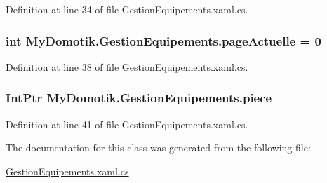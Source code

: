 Definition at line 34 of file Gestion\+Equipements.\+xaml.\+cs.

\subsubsection[{\texorpdfstring{page\+Actuelle}{pageActuelle}}]{\setlength{\rightskip}{0pt plus 5cm}int My\+Domotik.\+Gestion\+Equipements.\+page\+Actuelle = 0\hspace{0.3cm}{\ttfamily [private]}}\hypertarget{class_my_domotik_1_1_gestion_equipements_a87d2835bb2e08eeb5a1e0c047f11b958}{}\label{class_my_domotik_1_1_gestion_equipements_a87d2835bb2e08eeb5a1e0c047f11b958}


Definition at line 38 of file Gestion\+Equipements.\+xaml.\+cs.

\subsubsection[{\texorpdfstring{piece}{piece}}]{\setlength{\rightskip}{0pt plus 5cm}Int\+Ptr My\+Domotik.\+Gestion\+Equipements.\+piece\hspace{0.3cm}{\ttfamily [private]}}\hypertarget{class_my_domotik_1_1_gestion_equipements_a23d0e0a3640ee3bca3b1b163f65ab57b}{}\label{class_my_domotik_1_1_gestion_equipements_a23d0e0a3640ee3bca3b1b163f65ab57b}


Definition at line 41 of file Gestion\+Equipements.\+xaml.\+cs.



The documentation for this class was generated from the following file\+:\begin{DoxyCompactItemize}
\item 
\hyperlink{_gestion_equipements_8xaml_8cs}{Gestion\+Equipements.\+xaml.\+cs}\end{DoxyCompactItemize}
